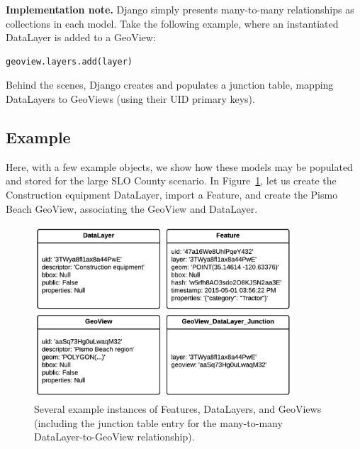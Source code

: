 \textbf{Implementation note.} Django simply presents many-to-many relationships as collections in each model. Take the following example, where an instantiated DataLayer is added to a GeoView:

\begin{Verbatim}[samepage=true,baselinestretch=1,xleftmargin=12mm]
geoview.layers.add(layer)
\end{Verbatim}

Behind the scenes, Django creates and populates a junction table, mapping DataLayers to GeoViews (using their UID primary keys).

\subsection{Example} Here, with a few example objects, we show how these models may be populated and stored for the large SLO County scenario. In Figure~\ref{fig:ex1}, let us create the Construction equipment DataLayer, import a Feature, and create the Pismo Beach GeoView, associating the GeoView and DataLayer.

\begin{figure}[ht]
    \centering
    \includegraphics[width=0.86\textwidth]{figures/ex1.png}
    \caption{Several example instances of Features, DataLayers, and GeoViews (including the junction table entry for the many-to-many DataLayer-to-GeoView relationship).}
    \label{fig:ex1}
\end{figure}

